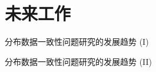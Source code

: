 \section{未来工作}


\begin{frame}{分布数据一致性问题研究的发展趋势 (I)}
  
\end{frame}
\begin{frame}{分布数据一致性问题研究的发展趋势 (II)}
  
\end{frame}
